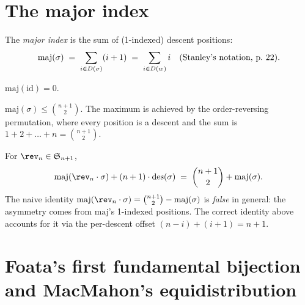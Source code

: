 \section{The major index}

\begin{definition}
  \label{def:maj}
  \rocqok
  The \emph{major index} is the sum of (1-indexed) descent positions:
  \[
    \mathrm{maj}(\sigma) \;=\; \sum_{i \in D(\sigma)} (i + 1)
    \;=\; \sum_{i \in D(w)} i \quad (\text{Stanley's notation, p.~22}).
  \]
\end{definition}

\begin{lemma}
  \label{lem:maj_id}
  \rocqok
  $\mathrm{maj}(\mathrm{id}) = 0$.
\end{lemma}

\begin{lemma}
  \label{lem:maj_le}
  \rocqok
  $\mathrm{maj}(\sigma) \leq \binom{n+1}{2}$.  The maximum is achieved
  by the order-reversing permutation, where every position is a descent
  and the sum is $1 + 2 + \dots + n = \binom{n+1}{2}$.
\end{lemma}

\begin{theorem}
  \label{thm:maj_rev_perm}
  \rocqok
  For $\rev_n \in \Snp{n+1}$,
  \[
    \mathrm{maj}(\rev_n \cdot \sigma) + (n + 1) \cdot \des(\sigma)
    \;=\; \binom{n+1}{2} + \mathrm{maj}(\sigma).
  \]
  The naive identity $\mathrm{maj}(\rev_n \cdot \sigma) = \binom{n+1}{2}
  - \mathrm{maj}(\sigma)$ is \emph{false} in general: the asymmetry
  comes from $\mathrm{maj}$'s 1-indexed positions.  The correct
  identity above accounts for it via the per-descent offset
  $(n - i) + (i + 1) = n + 1$.
\end{theorem}

\section{Foata's first fundamental bijection and MacMahon's equidistribution}

